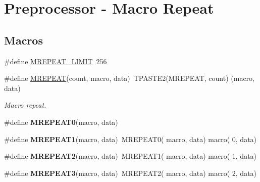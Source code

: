 \hypertarget{group__group__sam0__utils__mrepeat}{}\section{Preprocessor -\/ Macro Repeat}
\label{group__group__sam0__utils__mrepeat}
\subsection*{Macros}
\begin{DoxyCompactItemize}
\item 
\#define \hyperlink{group__group__sam0__utils__mrepeat_gab145883b0377c1a0065481f8609da400}{M\+R\+E\+P\+E\+A\+T\+\_\+\+L\+I\+M\+I\+T}~256
\item 
\#define \hyperlink{group__group__sam0__utils__mrepeat_ga42db715ccb877ca87d7903f5783bd104}{M\+R\+E\+P\+E\+A\+T}(count,  macro,  data)~T\+P\+A\+S\+T\+E2(M\+R\+E\+P\+E\+A\+T, count) (macro, data)
\begin{DoxyCompactList}\small\item\em Macro repeat. \end{DoxyCompactList}\item 
\hypertarget{group__group__sam0__utils__mrepeat_ga7f990d7cdc87a6f9166b4af1de35442f}{}\#define {\bfseries M\+R\+E\+P\+E\+A\+T0}(macro,  data)\label{group__group__sam0__utils__mrepeat_ga7f990d7cdc87a6f9166b4af1de35442f}

\item 
\hypertarget{group__group__sam0__utils__mrepeat_ga667cd6585e7a3579adf6cbcb4ba76cf9}{}\#define {\bfseries M\+R\+E\+P\+E\+A\+T1}(macro,  data)~M\+R\+E\+P\+E\+A\+T0(  macro, data)   macro(  0, data)\label{group__group__sam0__utils__mrepeat_ga667cd6585e7a3579adf6cbcb4ba76cf9}

\item 
\hypertarget{group__group__sam0__utils__mrepeat_gacd3377453f77f937bffd9bb00f6de684}{}\#define {\bfseries M\+R\+E\+P\+E\+A\+T2}(macro,  data)~M\+R\+E\+P\+E\+A\+T1(  macro, data)   macro(  1, data)\label{group__group__sam0__utils__mrepeat_gacd3377453f77f937bffd9bb00f6de684}

\item 
\hypertarget{group__group__sam0__utils__mrepeat_ga07e954bcdd0b8abbbe8a218540e503e3}{}\#define {\bfseries M\+R\+E\+P\+E\+A\+T3}(macro,  data)~M\+R\+E\+P\+E\+A\+T2(  macro, data)   macro(  2, data)\label{group__group__sam0__utils__mrepeat_ga07e954bcdd0b8abbbe8a218540e503e3}


\end{DoxyCompactItemize}
